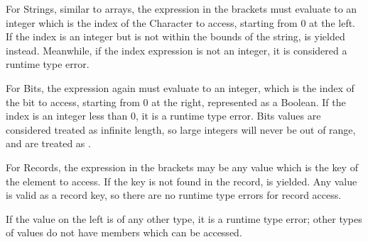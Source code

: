 For Strings, similar to arrays, the expression in the brackets must evaluate
to an integer which is the index of the Character to access, starting from 0
at the left. If the index is an integer but is not within the bounds of the
string,  is yielded instead. Meanwhile, if the index expression
is not an integer, it is considered a runtime type error.

\begin{prooftree}
\end{prooftree}

\begin{prooftree}
\end{prooftree}

For Bits, the expression again must evaluate to an integer, which
is the index of the bit to access, starting from 0 at the right,
represented as a Boolean. If the index is an integer less than 0,
it is a runtime type error. Bits values are considered treated as
infinite length, so large integers will never be out of range, and
are treated as .

\begin{prooftree}
\end{prooftree}

\begin{prooftree}
\end{prooftree}

For Records, the expression in the brackets may be any value which is
the key of the element to access. If the key is not found in the
record,  is yielded. Any value is valid as a record key,
so there are no runtime type errors for record access.

\begin{prooftree}
\end{prooftree}

If the value on the left is of any other type, it is a runtime type error;
other types of values do not have members which can be accessed.

